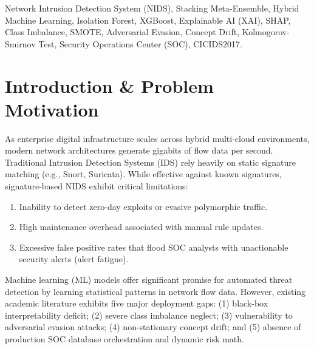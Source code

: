 \documentclass[conference]{IEEEtran}
\begin{document}
\begin{IEEEkeywords}
Network Intrusion Detection System (NIDS), Stacking Meta-Ensemble, Hybrid Machine Learning, Isolation Forest, XGBoost, Explainable AI (XAI), SHAP, Class Imbalance, SMOTE, Adversarial Evasion, Concept Drift, Kolmogorov-Smirnov Test, Security Operations Center (SOC), CICIDS2017.
\end{IEEEkeywords}

\section{Introduction \& Problem Motivation}
As enterprise digital infrastructure scales across hybrid multi-cloud environments, modern network architectures generate gigabits of flow data per second. Traditional Intrusion Detection Systems (IDS) rely heavily on static signature matching (e.g., Snort, Suricata). While effective against known signatures, signature-based NIDS exhibit critical limitations:
\begin{enumerate}
    \item Inability to detect zero-day exploits or evasive polymorphic traffic.
    \item High maintenance overhead associated with manual rule updates.
    \item Excessive false positive rates that flood SOC analysts with unactionable security alerts (alert fatigue).
\end{enumerate}

Machine learning (ML) models offer significant promise for automated threat detection by learning statistical patterns in network flow data. However, existing academic literature exhibits five major deployment gaps: (1) black-box interpretability deficit; (2) severe class imbalance neglect; (3) vulnerability to adversarial evasion attacks; (4) non-stationary concept drift; and (5) absence of production SOC database orchestration and dynamic risk math.
\end{document}
